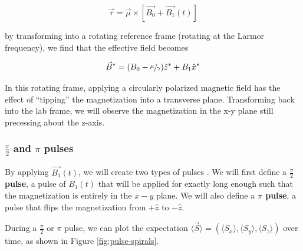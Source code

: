 \documentclass[
    floatfix,  %
    reprint,
    amsmath,
    amssymb,
    aps,
]{revtex4-2}
\newcommand{\halfpi}{\frac{\pi}{2}}
\begin{document}
\begin{equation}
    \vec{\tau} = \vec{\mu} \times  \left[\vec{B_0}+\vec{B_1}(t)\right]
\end{equation}

by transforming into a rotating reference frame (rotating at the Larmor frequency), we find that the effective field becomes

\begin{equation}
    \vec{B}^* = (B_0 - \sfrac{\mu}{\gamma}) \hat{z}^*+ B_1 \hat{x}^*
\end{equation}

In this rotating frame, applying a circularly polarized magnetic field has the effect of ``tipping'' the magnetization into a transverse plane. Transforming back into the lab frame, we will observe the magnetization in the x-y plane still precessing about the z-axis.



\subsubsection{$\halfpi$ and $\pi$ pulses}

By applying $\vec{B_1}(t)$, we will create two types of pulses \cite{hahn1950}. We will first define a \textbf{$\halfpi$ pulse}, a pulse of $B_1(t)$ that will be applied for exactly long enough such that the magnetization is entirely in the $x-y$ plane. We will also define a \textbf{$\pi$ pulse}, a pulse that flips the magnetization from $+\hat{z}$ to $-\hat{z}$.


During a $\halfpi$ or $\pi$ pulse, we can plot the expectation $\langle \vec{S} \rangle  = (\langle S_x \rangle, \langle S_y \rangle, \langle S_z \rangle)$ over time, as shown in Figure \ref{fig:pulse-spirals}.
\end{document}
